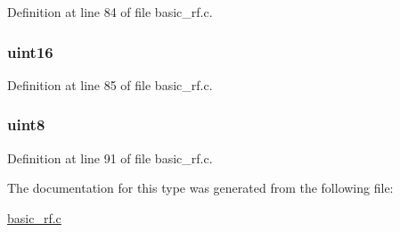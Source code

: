 Definition at line 84 of file basic\_\-rf.c.

\hypertarget{typebasic_rf_rx_info__t_a575b37eedb182085ff885c6898dd3f07}{
\subsubsection[{srcPanId}]{ {\bfseries uint16 } }}
\label{typebasic_rf_rx_info__t_a575b37eedb182085ff885c6898dd3f07}


Definition at line 85 of file basic\_\-rf.c.

\hypertarget{typebasic_rf_rx_info__t_ad94584ed274ed1d5b06d52f5bb3a178d}{
\subsubsection[{status}]{ {\bfseries uint8 } }}
\label{typebasic_rf_rx_info__t_ad94584ed274ed1d5b06d52f5bb3a178d}


Definition at line 91 of file basic\_\-rf.c.



The documentation for this type was generated from the following file:\begin{DoxyCompactItemize}
\item 
\hyperlink{basic__rf_8c}{basic\_\-rf.c}\end{DoxyCompactItemize}
